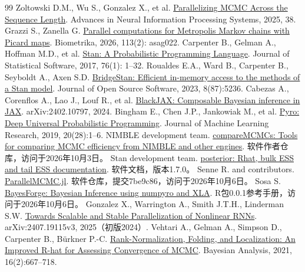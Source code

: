\begin{thebibliography}{99}\small\setlength{\itemsep}{3pt}
 Zoltowski D.M., Wu S., Gonzalez X., et al. \href{https://proceedings.nips.cc/paper_files/paper/2025/hash/202886ee1c9ca735cb5bff3a00a69883-Abstract-Conference.html}{Parallelizing MCMC Across the Sequence Length}. Advances in Neural Information Processing Systems, 2025, 38.
 Grazzi S., Zanella G. \href{https://doi.org/10.1093/biomet/asag022}{Parallel computations for Metropolis Markov chains with Picard maps}. Biometrika, 2026, 113(2): asag022.
 Carpenter B., Gelman A., Hoffman M.D., et al. \href{https://doi.org/10.18637/jss.v076.i01}{Stan: A Probabilistic Programming Language}. Journal of Statistical Software, 2017, 76(1): 1--32.
 Roualdes E.A., Ward B., Carpenter B., Seyboldt A., Axen S.D. \href{https://doi.org/10.21105/joss.05236}{BridgeStan: Efficient in-memory access to the methods of a Stan model}. Journal of Open Source Software, 2023, 8(87):5236.
 Cabezas A., Corenflos A., Lao J., Louf R., et al. \href{https://arxiv.org/abs/2402.10797}{BlackJAX: Composable Bayesian inference in JAX}. arXiv:2402.10797, 2024.
 Bingham E., Chen J.P., Jankowiak M., et al. \href{https://jmlr.org/papers/v20/18-403.html}{Pyro: Deep Universal Probabilistic Programming}. Journal of Machine Learning Research, 2019, 20(28):1--6.
 NIMBLE development team. \href{https://github.com/nimble-dev/compareMCMCs}{compareMCMCs: Tools for comparing MCMC efficiency from NIMBLE and other engines}. 软件作者仓库，访问于2026年10月3日。
 Stan development team. \href{https://mc-stan.org/posterior/reference/rhat.html}{posterior: Rhat, bulk ESS and tail ESS documentation}. 软件文档，版本1.7.0。
 Senne R. and contributors. \href{https://github.com/rsenne/ParallelMCMC.jl/tree/7be9c866c8be03ad994a5e7f0486ec3290088813}{ParallelMCMC.jl}. 软件仓库，提交7be9c86，访问于2026年10月6日。
 Sosa S. \href{https://cran.r-universe.dev/BayesForge/doc/manual.html}{BayesForge: Bayesian Inference using numpyro and XLA}. R包0.0.1参考手册，访问于2026年10月6日。
 Gonzalez X., Warrington A., Smith J.T.H., Linderman S.W. \href{https://arxiv.org/abs/2407.19115v3}{Towards Scalable and Stable Parallelization of Nonlinear RNNs}. arXiv:2407.19115v3, 2025（初版2024）.
 Vehtari A., Gelman A., Simpson D., Carpenter B., Bürkner P.-C. \href{https://doi.org/10.1214/20-BA1221}{Rank-Normalization, Folding, and Localization: An Improved R-hat for Assessing Convergence of MCMC}. Bayesian Analysis, 2021, 16(2):667--718.

\end{thebibliography}
